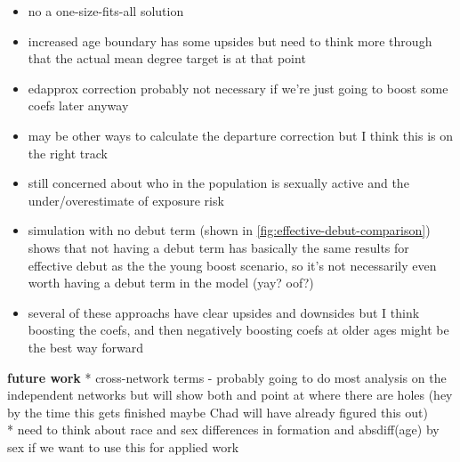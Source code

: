 \documentclass [11pt, proquest] {uwthesis}[2015/03/03]
\providecommand{\tightlist}{%
  \setlength{\itemsep}{0pt}\setlength{\parskip}{0pt}}
\begin{document}
\begin{itemize}
\tightlist
\item
  no a one-size-fits-all solution
\item
  increased age boundary has some upsides but need to think more through
  that the actual mean degree target is at that point
\item
  edapprox correction probably not necessary if we're just going to
  boost some coefs later anyway
\item
  may be other ways to calculate the departure correction but I think
  this is on the right track
\item
  still concerned about who in the population is sexually active and the
  under/overestimate of exposure risk
\item
  simulation with no debut term (shown in
  \ref{fig:effective-debut-comparison}) shows that not having a debut
  term has basically the same results for effective debut as the the
  young boost scenario, so it's not necessarily even worth having a
  debut term in the model (yay? oof?)\\
\item
  several of these approachs have clear upsides and downsides but I
  think boosting the coefs, and then negatively boosting coefs at older
  ages might be the best way forward
\end{itemize}
\textbf{future work} * cross-network terms - probably going to do most
analysis on the independent networks but will show both and point at
where there are holes (hey by the time this gets finished maybe Chad
will have already figured this out)\\
* need to think about race and sex differences in formation and
absdiff(age) by sex if we want to use this for applied work
\end{document}
